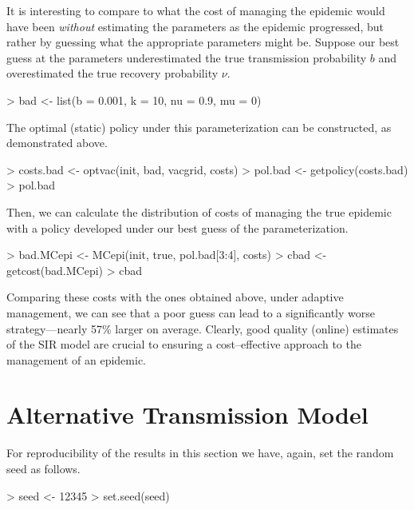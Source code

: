 \documentclass[shortnames,nojss]{jss}
\begin{document}
It is interesting to compare to what the cost of managing the epidemic
would have been {\em without} estimating the parameters as the
epidemic progressed, but rather by guessing what the appropriate
parameters might be.  Suppose our best guess at the parameters
underestimated the true transmission probability $b$ and overestimated
the true recovery probability $\nu$.
\begin{Schunk}
\begin{Sinput}
> bad <- list(b = 0.001, k = 10, nu = 0.9, mu = 0)
\end{Sinput}
\end{Schunk}
The optimal (static) policy under this parameterization can
be constructed, as demonstrated above.
\begin{Schunk}
\begin{Sinput}
> costs.bad <- optvac(init, bad, vacgrid, costs)
> pol.bad <- getpolicy(costs.bad)
> pol.bad
\end{Sinput}
\end{Schunk}
Then, we can calculate the distribution of costs of managing
the true epidemic with a policy developed under our best guess
of the parameterization.
\begin{Schunk}
\begin{Sinput}
> bad.MCepi <- MCepi(init, true, pol.bad[3:4], costs)
> cbad <- getcost(bad.MCepi)
> cbad
\end{Sinput}
\end{Schunk}
Comparing these costs with the ones obtained above, under adaptive
management, we can see that a poor guess can lead to a significantly
worse strategy---nearly 
57\% larger on average. 
Clearly, good quality (online)
estimates of the SIR model are crucial to ensuring a cost--effective
approach to the management of an epidemic.
\section{Alternative Transmission Model}
\label{sec:alt}

For reproducibility of the results in this section we have, again, set
the random seed as follows.
\begin{Schunk}
\begin{Sinput}
> seed <- 12345
> set.seed(seed)
\end{Sinput}
\end{Schunk}
\end{document}
